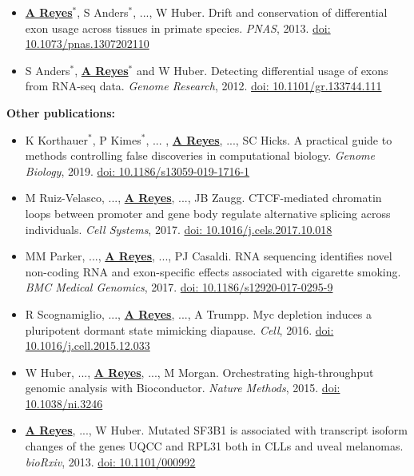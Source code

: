 \documentclass[11pt,a4paper,sans]{moderncv} %
\begin{document}
\begin{itemize}
\item \textbf{\underline{A Reyes}}$^{\ast}$, S Anders$^{\ast}$, ..., W Huber. Drift and conservation of differential exon usage across tissues in primate species. \textit{PNAS}, 2013. \href{https://doi.org/10.1073/pnas.1307202110}{doi: 10.1073/pnas.1307202110}
\item S Anders$^{\ast}$, \textbf{\underline{A Reyes}}$^{\ast}$ and W Huber. Detecting differential usage of exons from RNA-seq data. \textit{Genome Research}, 2012. \href{https://doi.org/10.1101/gr.133744.111}{doi: 10.1101/gr.133744.111}
\end{itemize}
\vspace{.1cm}
\textbf{Other publications:}
\vspace{.1cm}
\begin{itemize}
\item K Korthauer$^{\ast}$, P Kimes$^{\ast}$, ... ,
  \textbf{\underline{A Reyes}}, ..., SC Hicks. A practical guide to
  methods controlling false discoveries in computational
  biology. \textit{Genome Biology}, 2019. \href{https://doi.org/10.1186/s13059-019-1716-1}{doi: 10.1186/s13059-019-1716-1}
\item M Ruiz-Velasco, ..., \textbf{\underline{A Reyes}}, ..., JB Zaugg. CTCF-mediated chromatin loops between promoter and gene body regulate alternative splicing across individuals. \textit{Cell Systems}, 2017. \href{http://dx.doi.org/10.1016/j.cels.2017.10.018}{doi: 10.1016/j.cels.2017.10.018}
\item MM Parker, ..., \textbf{\underline{A Reyes}}, ..., PJ Casaldi. RNA sequencing identifies novel non-coding RNA and exon-specific effects associated with cigarette smoking. \textit{BMC Medical Genomics}, 2017. \href{https://doi.org/10.1186/s12920-017-0295-9}{doi: 10.1186/s12920-017-0295-9}
\item R Scognamiglio, ..., \textbf{\underline{A Reyes}}, ..., A Trumpp. Myc depletion induces a pluripotent dormant state mimicking diapause. \textit{Cell}, 2016. \href{https://doi.org/10.1016/j.cell.2015.12.033}{doi: 10.1016/j.cell.2015.12.033}
\item W Huber, ..., \textbf{\underline{A Reyes}}, ..., M Morgan. Orchestrating high-throughput genomic analysis with Bioconductor. \textit{Nature Methods}, 2015. \href{https://doi.org/10.1038/ni.3246}{doi: 10.1038/ni.3246}
\item \textbf{\underline{A Reyes}}, ..., W Huber. Mutated SF3B1 is associated with transcript isoform changes of the genes UQCC and RPL31 both in CLLs and uveal melanomas. \textit{bioRxiv}, 2013. \href{https://doi.org/10.1101/000992}{doi: 10.1101/000992}

\end{itemize}
\end{document}
